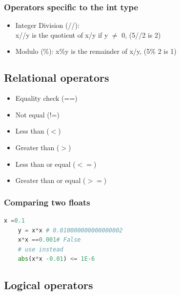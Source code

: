 \documentclass[12pt,oneside]{book}
\begin{document}
\subsubsection{Operators specific to the int type}
\begin{itemize}
	\item Integer Division (//):\\
	      x//y is the quotient of x/y if y $\not = $ 0, (5//2 is 2)
	\item Modulo (\%): x\%y is the remainder of x/y, (5\% 2 is 1)
\end{itemize}
\subsection{Relational operators}
\begin{itemize}
	\item Equality check (==)
	\item Not equal (!=)
	\item Less than ($<$)
	\item Greater than ($>$)
	\item Less than or equal ($<=$)
	\item Greater than or equal ($>=$)
\end{itemize}
\subsubsection{Comparing two floats}
\begin{lstlisting}[language=python]
    x =0.1
    y = x*x # 0.010000000000000002
    x*x ==0.001# False 
    # use instead 
    abs(x*x -0.01) <= 1E-6
\end{lstlisting}
\subsection{Logical operators}
\end{document}
